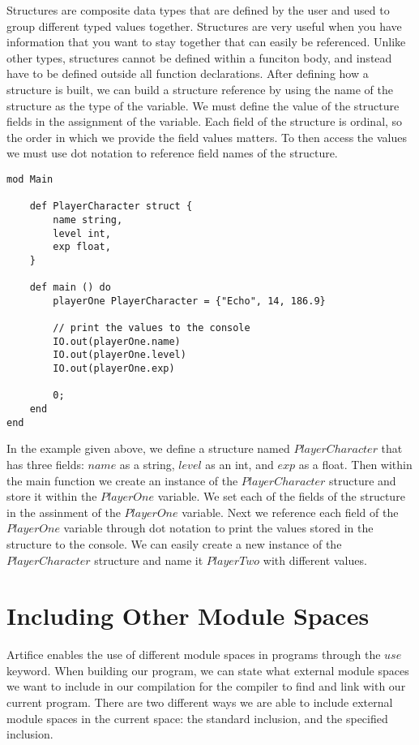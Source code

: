 \documentclass{article}
\begin{document}
Structures are composite data types that are defined by the user and used to group different typed values together. Structures are very useful when you have information
that you want to stay together that can easily be referenced. Unlike other types, structures cannot be defined within a funciton body, and instead have to be defined outside all
function declarations. After defining how a structure is built, we can build a structure reference by using the name of the structure as the type of the variable. We must
define the value of the structure fields in the assignment of the variable. Each field of the structure is ordinal, so the order in which we provide
the field values matters. To then access the values we must use dot notation to reference field names of the structure.

\begin{lstlisting}
mod Main

	def PlayerCharacter struct {
		name string,
		level int,
		exp float,
	}

	def main () do
		playerOne PlayerCharacter = {"Echo", 14, 186.9}

		// print the values to the console
		IO.out(playerOne.name)
		IO.out(playerOne.level)
		IO.out(playerOne.exp)

		0;
	end
end
\end{lstlisting}

In the example given above, we define a structure named $PlayerCharacter$ that has three fields: $name$ as a string, $level$ as an int, and $exp$
as a float. Then within the main function we create an instance of the $PlayerCharacter$ structure and store it within the $PlayerOne$ variable.
We set each of the fields of the structure in the assinment of the $PlayerOne$ variable. Next we reference each field of the $PlayerOne$ variable
through dot notation to print the values stored in the structure to the console. We can easily create a new instance of the $PlayerCharacter$ structure
and name it $PlayerTwo$ with different values.


\section{Including Other Module Spaces}

Artifice enables the use of different module spaces in programs through the $use$ keyword. When building our program, we can state what external module spaces we want to include in
our compilation for the compiler to find and link with our current program. There are two different ways we are able to include external module spaces in the current space: the
standard inclusion, and the specified inclusion.
\end{document}
